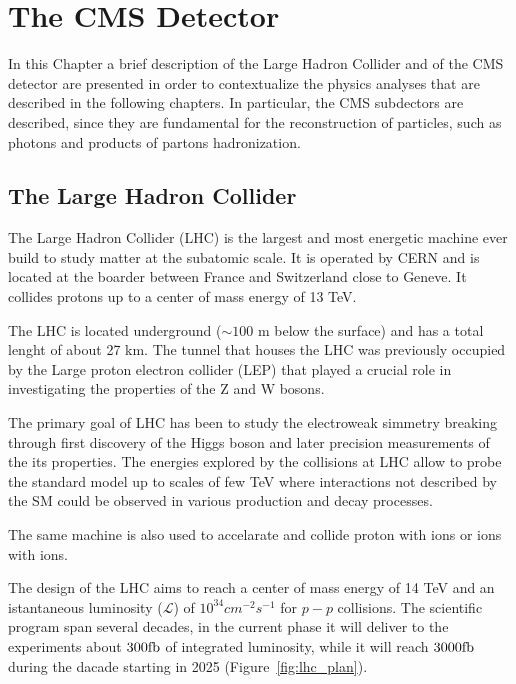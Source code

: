 \chapter{The CMS Detector}
\label{chapter:cms}

In this Chapter a brief description of the Large Hadron Collider and of the CMS detector are
presented in order to contextualize the physics analyses that are described in the following chapters.
In particular, the CMS subdectors are described, since they are fundamental for the reconstruction of particles,
such as photons and products of partons hadronization.

\section{The Large Hadron Collider}

The Large Hadron Collider (LHC) is the largest and most energetic machine ever build to study
matter at the subatomic scale. It is operated by CERN and is located at the boarder between France and
Switzerland close to Geneve. It collides protons up to a center of mass energy of 13 TeV.

The LHC is located underground ($\sim 100$ m below the surface) and has a total lenght of about 27 km.
The tunnel that houses the LHC was previously occupied by the Large proton electron collider (LEP) that
played a crucial role in investigating the properties of the Z and W bosons.

The primary goal of LHC has been to study the electroweak simmetry breaking through first discovery of the Higgs boson and later
precision measurements of the its properties.
The energies explored by the collisions at LHC allow to probe the standard model up to scales of few TeV where
interactions not described by the SM could be observed in various production and decay processes.

The same machine is also used to accelarate and collide proton with ions or ions with ions.

The design of the LHC aims to reach a center of mass energy of 14 TeV and an istantaneous luminosity ($\mathcal{L}$)
of $10^{34}cm^{-2}s^{-1}$ for $p-p$ collisions. The scientific program span several decades, in the current phase it will
deliver to the experiments about $300 \mathrm{fb}$ of integrated luminosity, while it will reach $3000 \mathrm{fb}$ during the dacade
starting in 2025 (Figure~\ref{fig:lhc_plan}). 

